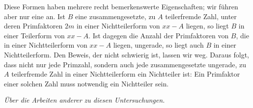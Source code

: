 Diese Formen haben mehrere recht bemerkenswerte Eigenschaften; wir führen aber nur eine an. Ist $B$ eine zusammengesetzte, zu $A$ teilerfremde Zahl, unter deren Primfaktoren $2m$ in einer Nichtteilerform von $xx-A$ liegen, so liegt $B$ in einer Teilerform von $xx-A$. Ist dagegen die Anzahl der Primfaktoren von $B$, die in einer Nichtteilerform von $xx-A$ liegen, ungerade, so liegt auch $B$ in einer Nichtteilerform. Den Beweis, der nicht schwierig ist, lassen wir weg. Daraus folgt, dass nicht nur jede Primzahl, sondern auch jede zusammengesetzte ungerade, zu $A$ teilerfremde Zahl in einer Nichtteilerform ein Nichtteiler ist: Ein Primfaktor einer solchen Zahl muss notwendig ein Nichtteiler sein.

\begin{center}\textit{Über die Arbeiten anderer zu diesen Untersuchungen.}\end{center}

